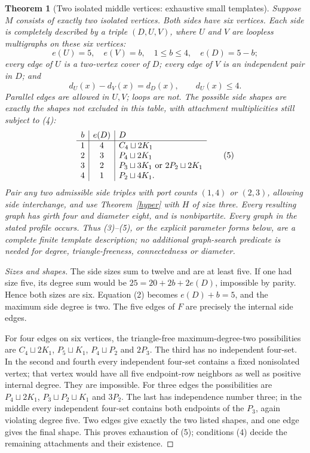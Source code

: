 \documentclass[11pt]{article}
\newtheorem{theorem}{Theorem}
\begin{document}
\begin{theorem}[Two isolated middle vertices: exhaustive small templates]
\label{two}
Suppose $M$ consists of exactly two isolated vertices. Both sides have
six vertices. Each side is completely described by a triple $(D,U,V)$,
where $U$ and $V$ are loopless multigraphs on these six vertices:
\[
 e(U)=5,\quad e(V)=b,\quad 1\leq b\leq4,\quad e(D)=5-b;
                                                               \tag{3}
\]
every edge of $U$ is a two-vertex cover of $D$; every edge of $V$
is an independent pair in $D$; and
\[
 d_U(x)-d_V(x)=d_D(x),\qquad d_U(x)\leq4.          \tag{4}
\]
Parallel edges are allowed in $U,V$; loops are not. The possible
side shapes are exactly the shapes not excluded in this table, with
attachment multiplicities still subject to (4):
\[
\begin{array}{c|c|l}
b&e(D)&D\\\hline
1&4&C_4\sqcup2K_1\\
2&3&P_4\sqcup2K_1\\
3&2&P_3\sqcup3K_1\ \hbox{or}\ 2P_2\sqcup2K_1\\
4&1&P_2\sqcup4K_1.
\end{array}                                                    \tag{5}
\]
Pair any two admissible side triples with port counts $(1,4)$ or
$(2,3)$, allowing side interchange, and use Theorem~\ref{hyper} with
$H$ of size three. Every resulting graph has girth four and diameter
eight, and is nonbipartite. Every graph in the stated profile occurs.
Thus (3)--(5), or the explicit parameter forms below, are a complete
finite template description; no additional graph-search predicate
is needed for degree, triangle-freeness, connectedness or diameter.
\end{theorem}
\begin{proof}[Sizes and shapes]
The side sizes sum to twelve and are at least five. If one had size
five, its degree sum would be $25=20+2b+2e(D)$, impossible by parity.
Hence both sizes are six. Equation (2) becomes $e(D)+b=5$, and the
maximum side degree is two. The five edges of $F$ are precisely the
internal side edges.

For four edges on six vertices, the triangle-free maximum-degree-two
possibilities are $C_4\sqcup2K_1$, $P_5\sqcup K_1$,
$P_4\sqcup P_2$ and $2P_3$. The third has no independent four-set.
In the second and fourth every independent four-set contains a fixed
nonisolated vertex; that vertex would have all five endpoint-row
neighbors as well as positive internal degree. They are impossible.
For three edges the possibilities are $P_4\sqcup2K_1$,
$P_3\sqcup P_2\sqcup K_1$ and $3P_2$. The last has independence
number three; in the middle every independent four-set contains both
endpoints of the $P_3$, again violating degree five. Two edges give
exactly the two listed shapes, and one edge gives the final shape.
This proves exhaustion of (5); conditions (4) decide the remaining
attachments and their existence.
\end{proof}
\end{document}
